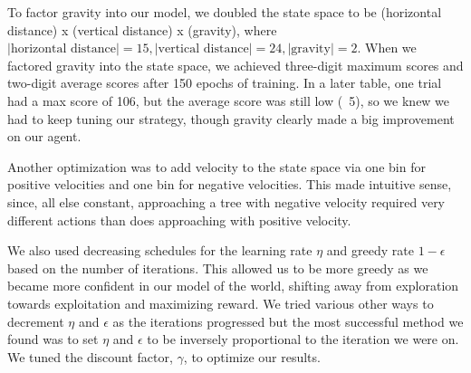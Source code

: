 \documentclass[11pt]{article}
\begin{document}
To factor gravity into our model, we doubled the state space to be (horizontal distance) x (vertical distance) x (gravity), where $|\text{horizontal distance}| = 15, |\text{vertical distance}| = 24, |\text{gravity}| = 2$. When we factored gravity into the state space, we achieved three-digit maximum scores and two-digit average scores after 150 epochs of training. In a later table, one trial had a max score of 106, but the average score was still low (~5), so we knew we had to keep tuning our strategy, though gravity clearly made a big improvement on our agent.

Another optimization was to add velocity to the state space via one bin for positive velocities and one bin for negative velocities. This made intuitive sense, since, all else constant, approaching a tree with negative velocity required very different actions than does approaching with positive velocity.

We also used decreasing schedules for the learning rate $\eta$ and greedy rate $1-\epsilon$ based on the number of iterations. This allowed us to be more greedy as we became more confident in our model of the world, shifting away from exploration towards exploitation and maximizing reward.  We tried various other ways to decrement $\eta$ and $\epsilon$ as the iterations progressed but the most successful method we found was to set $\eta$ and $\epsilon$ to be inversely proportional to the iteration we were on.  We tuned the discount factor, $\gamma$, to optimize our results. 
\end{document}
